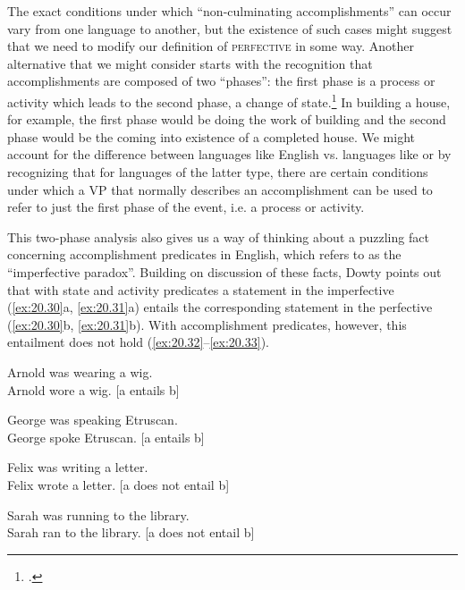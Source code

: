 The exact conditions under which “non-culminating accomplishments” can occur vary from one language to another, but the existence of such cases might suggest that we need to modify our definition of \textsc{perfective} in some way. Another alternative that we might consider starts with the recognition that accomplishments are composed of two “phases”: the first phase is a process or activity which leads to the second phase, a change of state.\footnote{\citet{KleinEtAl2000}.} In building a house, for example, the first phase would be doing the work of building and the second phase would be the coming into existence of a completed house. We might account for the difference between languages like English vs. languages like  or  by recognizing that for languages of the latter type, there are certain conditions under which a VP that normally describes an accomplishment can be used to refer to just the first phase of the event, i.e. a process or activity.



This two-phase analysis also gives us a way of thinking about a puzzling fact concerning accomplishment predicates in English, which \citet{Dowty1979} refers to as the “imperfective paradox”. Building on  discussion of these facts, Dowty points out that with state and activity predicates a statement in the imperfective (\ref{ex:20.30}a, \ref{ex:20.31}a) entails the corresponding statement in the perfective (\ref{ex:20.30}b, \ref{ex:20.31}b). With accomplishment predicates, however, this entailment does not hold (\ref{ex:20.32}--\ref{ex:20.33}).


\ea \label{ex:20.30}
\ea  Arnold was wearing a wig.\\
\ex Arnold wore a wig. \hfill [a entails b]
                       \z
\z

\ea \label{ex:20.31}
\ea  George was speaking {Etruscan}.\\
\ex George spoke {Etruscan}. \hfill [a entails b]
                       \z
\z

\ea \label{ex:20.32}
\ea  Felix was writing a letter.\\
\ex Felix wrote a letter. \hfill [a does not entail b]
                       \z
\z

\ea \label{ex:20.33}
\ea  Sarah was running to the library.\\
\ex Sarah ran to the library. \hfill [a does not entail b]
                       \z
\z


